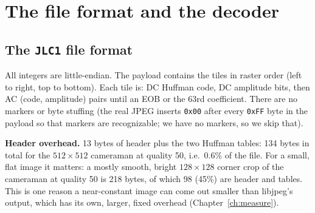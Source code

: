 \chapter{The file format and the decoder}\label{ch:format}

\section{The \texttt{JLC1} file format}

\begin{center}
\end{center}

All integers are little-endian. The payload contains the tiles in raster order (left to right, top to bottom). Each tile is: DC Huffman code, DC amplitude bits, then AC (code, amplitude) pairs until an EOB or the 63rd coefficient. There are no markers or byte stuffing (the real JPEG inserts \texttt{0x00} after every \texttt{0xFF} byte in the payload so that markers are recognizable; we have no markers, so we skip that).

\begin{plain}
\textbf{Header overhead.} 13 bytes of header plus the two Huffman tables: 134 bytes in total for the $512\times512$ cameraman at quality 50, i.e.\ 0.6\% of the file. For a small, flat image it matters: a mostly smooth, bright $128\times128$ corner crop of the cameraman at quality 50 is 218 bytes, of which 98 (45\%) are header and tables. This is one reason a near-constant image can come out smaller than libjpeg's output, which has its own, larger, fixed overhead (Chapter~\ref{ch:measure}).
\end{plain}

